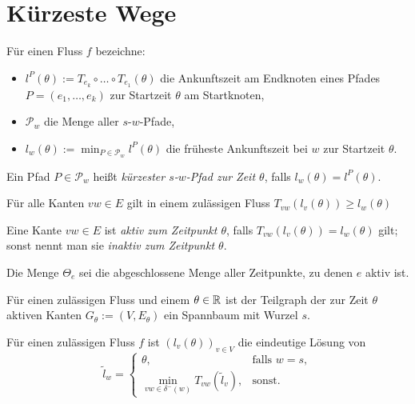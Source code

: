 \section{Kürzeste Wege}

\begin{frame}
	\begin{definition}
		Für einen Fluss $f$ bezeichne:
		\begin{itemize}[label=\color{darkblue}$\bullet$]
			\item $l^P(\theta):= T_{e_k}\circ\dots\circ T_{e_1}(\theta)$ die Ankunftszeit am Endknoten eines Pfades $P=(e_1,\dots,e_k)$ zur Startzeit $\theta$ am Startknoten,
			\item $\mathcal{P}_w$ die Menge aller $s$-$w$-Pfade,
			\item $l_w(\theta) := \min_{P\in\mathcal{P}_w} l^P(\theta)$ die früheste Ankunftszeit bei $w$ zur Startzeit $\theta$.
		\end{itemize}
	Ein Pfad $P\in \mathcal{P}_w$ heißt \emph{kürzester $s$-$w$-Pfad zur Zeit $\theta$}, falls $l_w(\theta)=l^P(\theta)$.
	\end{definition}
	\begin{lemma}[Dreiecksungleichung]
		Für alle Kanten $vw\in E$ gilt in einem zulässigen Fluss $T_{vw}(l_v(\theta))\geq l_w(\theta)$
	\end{lemma}
\end{frame}

\begin{frame}
	\begin{definition}
		Eine Kante $vw\in E$ ist \emph{aktiv zum Zeitpunkt $\theta$}, falls $T_{vw}(l_v(\theta)) = l_w(\theta)$ gilt; sonst nennt man sie \emph{inaktiv zum Zeitpunkt $\theta$}.
		
		Die Menge $\Theta_e$ sei die abgeschlossene Menge aller Zeitpunkte, zu denen $e$ aktiv ist.
	\end{definition}
	\begin{lemma}
		Für einen zulässigen Fluss und einem $\theta\in\mathbb{R}$ ist der Teilgraph der zur Zeit $\theta$ aktiven Kanten $G_\theta:=(V, E_\theta)$ ein Spannbaum mit Wurzel $s$.
	\end{lemma}
	\begin{proposition}
			Für einen zulässigen Fluss $f$ ist $(l_v(\theta))_{v\in V}$ die eindeutige Lösung von
		\[ \tilde{l}_w = \begin{cases}
		\theta, & \text{falls } w=s, \\
		\min\limits_{vw\in \delta^-(w)} T_{vw}(\tilde{l}_v), & \text{sonst}.
		\end{cases} \]
	\end{proposition}
\end{frame}